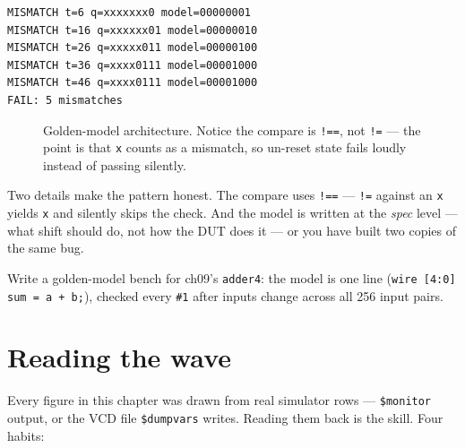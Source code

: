 \begin{lstlisting}[caption={Real run. Notice two things: the early
rows are un-reset \texttt{x} surfacing (\S\ref{sec:we-xprop} ---
\texttt{!==} treats them as mismatches, honestly), and t=46 shows the
planted bug itself --- bit~0 flipped, exactly the XOR's
signature.},abovecaptionskip=0pt,label={lst:goldenout}]
MISMATCH t=6 q=xxxxxxx0 model=00000001
MISMATCH t=16 q=xxxxxx01 model=00000010
MISMATCH t=26 q=xxxxx011 model=00000100
MISMATCH t=36 q=xxxx0111 model=00001000
MISMATCH t=46 q=xxxx0111 model=00001000
FAIL: 5 mismatches
\end{lstlisting}

\begin{figure}[htbp]
\centering

\caption{Golden-model architecture. Notice the compare is
\texttt{!==}, not \texttt{!=} --- the point is that \texttt{x} counts
as a mismatch, so un-reset state fails loudly instead of passing
silently.}
\label{fig:golden}
\end{figure}

Two details make the pattern honest. The compare uses
\texttt{!==} --- \texttt{!=} against an
\texttt{x} yields \texttt{x} and silently skips the check. And the
model is written at the \emph{spec} level --- what shift should do,
not how the DUT does it --- or you have built two copies of the same
bug.

\begin{exercise}[hard]
Write a golden-model bench for ch09's \texttt{adder4}: the model is
one line (\texttt{wire [4:0] sum = a + b;}), checked every
\texttt{\#1} after inputs change across all 256 input pairs.
\end{exercise}

\section{Reading the wave}\label{sec:waveread}

Every figure in this chapter was drawn from real
simulator rows --- \texttt{\$monitor} output, or the VCD file
\texttt{\$dumpvars} writes. Reading them back is the skill. Four
habits:

